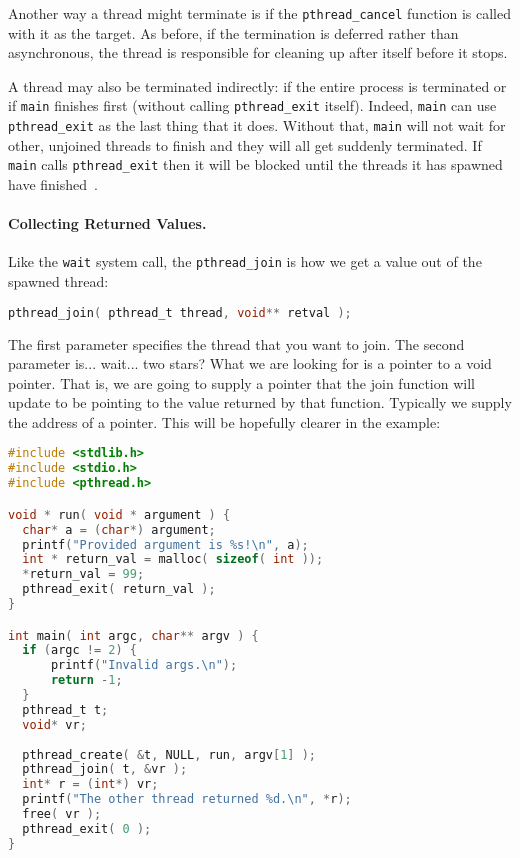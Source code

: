 Another way a thread might terminate is if the \texttt{pthread\_cancel} function is called with it as the target. As before, if the termination is deferred rather than asynchronous, the thread is responsible for cleaning up after itself before it stops.

A thread may also be terminated indirectly: if the entire process is terminated or if \texttt{main} finishes first (without calling \texttt{pthread\_exit} itself). Indeed, \texttt{main} can use \texttt{pthread\_exit} as the last thing that it does. Without that, \texttt{main} will not wait for other, unjoined threads to finish and they will all get suddenly terminated. If \texttt{main} calls \texttt{pthread\_exit} then it will be blocked until the threads it has spawned have finished~\cite{pthreads}.

\paragraph{Collecting Returned Values.} Like the \texttt{wait} system call, the \texttt{pthread\_join} is how we get a value out of the spawned thread:

\begin{lstlisting}[language=C]
pthread_join( pthread_t thread, void** retval );
\end{lstlisting}

The first parameter specifies the thread that you want to join. The second parameter is... wait... two stars? What we are looking for is a pointer to a void pointer. That is, we are going to supply a pointer that the join function will update to be pointing to the value returned by that function. Typically we supply the address of a pointer. This will be hopefully clearer in the example:

\begin{lstlisting}[language=C]
#include <stdlib.h>
#include <stdio.h>
#include <pthread.h>

void * run( void * argument ) { 
  char* a = (char*) argument;
  printf("Provided argument is %s!\n", a); 
  int * return_val = malloc( sizeof( int )); 
  *return_val = 99; 
  pthread_exit( return_val );
}

int main( int argc, char** argv ) { 
  if (argc != 2) {
      printf("Invalid args.\n");
      return -1; 
  }
  pthread_t t;
  void* vr; 
  
  pthread_create( &t, NULL, run, argv[1] );
  pthread_join( t, &vr );
  int* r = (int*) vr; 
  printf("The other thread returned %d.\n", *r);
  free( vr );
  pthread_exit( 0 );
}
\end{lstlisting}

